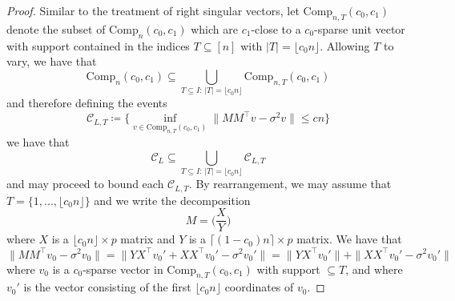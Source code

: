 \documentclass[11pt]{article}
\numberwithin{equation}{section}
\theoremstyle{remark}
\newcommand{\Comp}{\mathrm{Comp}}
\begin{document}
\begin{proof}
   Similar to the treatment of right singular vectors, let $\Comp_{n, T}(c_0, c_1)$ denote the subset of $\Comp_{n}(c_0, c_1)$ which are $c_1$-close to a $c_0$-sparse unit vector with support contained in the indices $T \subseteq [n]$ with $|T| = \lfloor c_0 n \rfloor$. Allowing $T$ to vary, we have that
    \begin{equation*}
        \Comp_{n}(c_0, c_1) \subseteq \bigcup_{T \subseteq I : \, |T| = \lfloor c_0 n \rfloor}\Comp_{n, T}(c_0, c_1)
    \end{equation*}
    and therefore defining the events 
    \begin{equation*}
        \mathcal{C}_{L, T} \coloneqq \bigg\{ \inf_{v \in \Comp_{n, T}(c_0, c_1)}\|MM^\top v - \sigma^2 v\| \leq c n \bigg\}
    \end{equation*}
    we have that 
    \begin{equation*}
        \mathcal{C}_L \subseteq \bigcup_{T \subseteq I : \, |T| = \lfloor c_0 n \rfloor}\mathcal{C}_{L, T}
    \end{equation*}
    and may proceed to bound each $\mathcal{C}_{L, T}$. By rearrangement, we may assume that $T = \{ 1, ..., \lfloor c_0 n \rfloor \}$ and we write the decomposition 
    \begin{equation*}
        M = \bigg(\frac{X}{Y}\bigg)
    \end{equation*}
    where $X$ is a $\lfloor c_0 n \rfloor \times p$ matrix and $Y$ is a $\lceil(1 - c_0)n \rceil \times p$ matrix. We have that
    \begin{equation}\label{eq-left-compressible-decomp}
        \| MM^\top v_0 - \sigma^2 v_0\| = \|YX^\top v_0' + XX^\top v_0' - \sigma^2 v_0'\| = \|YX^\top v_0'\| + \|XX^\top v_0' - \sigma^2 v_0'\|
    \end{equation}
    where $v_0$ is a $c_0$-sparse vector in $\Comp_{n, T}(c_0, c_1)$ with support $\subseteq T$, and where $v_0'$ is the vector consisting of the first $\lfloor c_0 n \rfloor$ coordinates of $v_0$. 
    

\end{proof}
\end{document}
